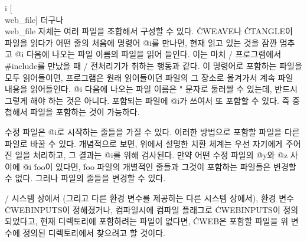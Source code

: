 \@{i} [\\{web\_file}] 
더구나 \\{web\_file} 자체는 여러 파일을 조합해서 구성할 수 있다.
\.{CWEAVE}나 \.{CTANGLE}이 파일을 읽다가 어떤 줄의 처음에 명령어
\.{@i}를 만나면, 현재 읽고 있는 것을 잠깐 멈추고 \.{@i} 다음에 나오는
파일 이름의 파일을 읽어 들인다. 이는 마치 \CEE/ 프로그램에서
\.{\#include}를 만났을 때 \CEE/ 전처리기가 취하는 행동과 같다. 이
명령어로 포함하는 파일을 모두 읽어들이면, 프로그램은 원래 읽어들이던
파일의 그 장소로 옮겨가서 계속 파일 내용을 읽어들인다. \.{@i} 다음에
나오는 파일 이름은 \." 문자로 둘러쌀 수 있는데, 반드시 그렇게 해야 하는
것은 아니다. 포함되는 파일에 \.{@i}가 쓰여서 또 포함할 수 있다. 즉
중첩해서 파일을 포함하는 것이 가능하다.

\more
수정 파일은 \.{@i}로 시작하는 줄들을 가질 수 있다. 이러한 방법으로 포함할 파일을 다른 파일로
바꿀 수 있다. 개념적으로 보면, 위에서 설명한 치환 체계는 우선 자기에게 주어진 일을 처리하고,
그 결과는 \.{@i}를 위해 검사된다. 만약 어떤 수정 파일의 \.{@y}와 \.{@z} 사이에 \.{@i}
\.{foo}이 있다면, \.{foo} 파일의 개별적인 줄들과 그것이 포함하는 파일들은 변경할 수 없다.
그러나 파일의 줄들을 변경할 수 있다. 

\more \UNIX/ 시스템 상에서 (그리고 다른 환경 변수를 제공하는 다른 시스템 상에서), 환경 변수
\.{CWEBINPUTS}이 정해졌거나, 컴파일시에 컴파일 플래그로 \.{CWEBINPUTS}이
정의되었다고, 현재 디렉토리에 포함하려는 파일이 없다면, \.{CWEB}은 포함할 파일을 위 변수에
정의된 디렉토리에서 찾으려고 할 것이다.

